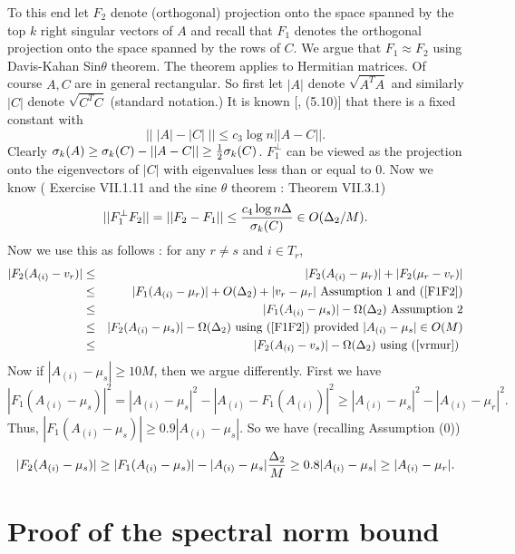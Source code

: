 \documentclass{book}
\numberwithin{exercise}{chapter}
\begin{document}
To this end let $F_2$ denote (orthogonal) projection
onto the space spanned by the top $k$ right singular vectors of $A$ and recall
that $F_1$
denotes the orthogonal projection onto the space spanned by the rows of $C$.
We argue that $F_1\approx F_2$ using Davis-Kahan Sin$\theta$ theorem.
The theorem applies to Hermitian matrices. Of course $A,C$ are in general
rectangular. So
first let $|A|$ denote $\sqrt {A^TA}$ and similarly $|C|$ denote
$\sqrt {C^TC}$ (standard notation.) It is known [\cite{Bhatia1994}, (5.10)]
that there is a
fixed constant with
$$\left|\left| \; |A|-|C|\; \right|\right| \leq c_3\log n ||A-C||.$$
Clearly $\sigma_k(A)\geq \sigma_k(C)-||A-C||\geq {1\over 2}\sigma_k(C)$.
$F_1^\perp$ can be viewed as the projection onto
the eigenvectors of $|C|$ with eigenvalues less than or equal to 0.
Now we know (\cite{bhatia}  Exercise VII.1.11 and the sine $\theta$ theorem : Theorem VII.3.1)
\begin{equation}\label{F1F2}
||F_1^\perp F_2||=||F_2-F_1||\leq {c_4\log n\Delta \over \sigma_k(C)}\in O(\Delta_2/M).
\end{equation}
Now we use this as follows : for any $r\not= s$ and $i\in T_r$,
\begin{eqnarray*}
|F_2(A_{(i)}-v_r)| &\leq& |F_2(A_{(i)}-\mu_r)|+|F_2(\mu_r-v_r)|\\
&\leq& |F_1(A_{(i)}-\mu_r)|+O(\Delta_2)+|v_r-\mu_r|\hbox{  Assumption 1 and (\ref{F1F2})}\\
&\leq& |F_1(A_{(i)}-\mu_s)| -\Omega(\Delta_2) \hbox{ Assumption 2}\\
&\leq& |F_2(A_{(i)}-\mu_s)|-\Omega(\Delta_2) \hbox{  using (\ref{F1F2}) provided }|A_{(i)}-\mu_s|\in O(M)\\
&\leq& |F_2(A_{(i)}-v_s)| -\Omega(\Delta_2) \hbox{ using (\ref{vrmur}) }
\end{eqnarray*}
Now if $|A_{(i)}-\mu_s|\geq 10M$, then we argue differently. First we have
$$|F_1(A_{(i)}-\mu_s)|^2 = |A_{(i)}-\mu_s|^2-|A_{(i)}-F_1(A_{(i)})|^2\geq |A_{(i)}-\mu_s|^2-|A_{(i)}-\mu_r|^2.$$
Thus, $|F_1(A_{(i)}-\mu_s)|\geq 0.9 |A_{(i)}-\mu_s|$. So we have (recalling Assumption (0))
$$|F_2(A_{(i)}-\mu_s)|\geq |F_1(A_{(i)}-\mu_s)|-|A_{(i)}-\mu_s|{\Delta_2\over M}\geq 0.8|A_{(i)}-\mu_s|
\geq |A_{(i)}-\mu_r|.$$



\section{Proof of the spectral norm bound}\label{sec:eigbound}
\end{document}
